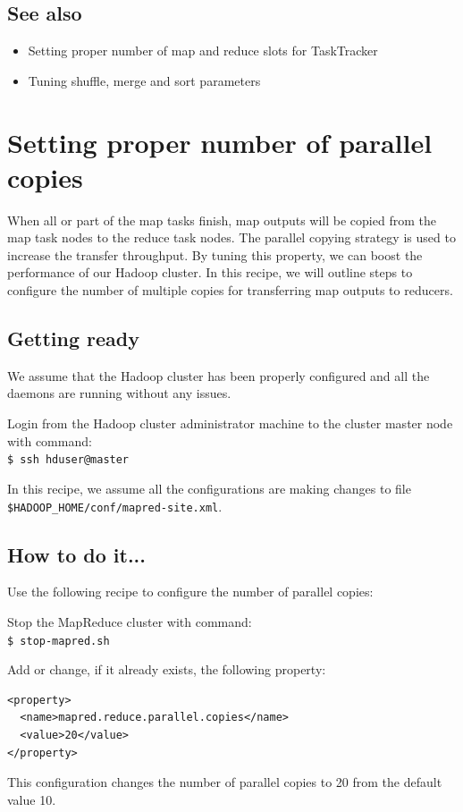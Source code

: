 \subsection*{See also}
\begin{itemize}
  \item Setting proper number of map and reduce slots for TaskTracker
  \item Tuning shuffle, merge and sort parameters
\end{itemize}

\section{Setting proper number of parallel copies}
When all or part of the map tasks finish, map outputs will be copied from the map task nodes to the reduce task nodes. The parallel copying strategy is used to increase the transfer throughput. By tuning this property, we can boost the performance of our Hadoop cluster. In this recipe, we will outline steps to configure the number of multiple copies for transferring map outputs to reducers.
\subsection*{Getting ready}
We assume that the Hadoop cluster has been properly configured and all the daemons are running without any issues.

Login from the Hadoop cluster administrator machine to the cluster master node with command: \\
\verb|$ ssh hduser@master|

In this recipe, we assume all the configurations are making changes to file \verb|$HADOOP_HOME/conf/mapred-site.xml|.
\subsection*{How to do it...}
Use the following recipe to configure the number of parallel copies:

Stop the MapReduce cluster with command: \\
\verb|$ stop-mapred.sh|

Add or change, if it already exists, the following property:
\lstset{style=bashstyle}
\begin{lstlisting}
<property>
  <name>mapred.reduce.parallel.copies</name>
  <value>20</value>
</property>
\end{lstlisting}

This configuration changes the number of parallel copies to 20 from the default value 10.


